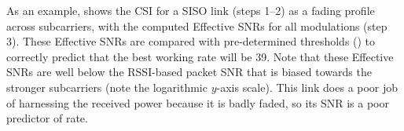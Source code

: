As an example,  shows the CSI for a SISO link (steps 1--2) as a fading profile across subcarriers, with the computed Effective SNRs for all modulations (step 3). These Effective SNRs are compared with pre-determined thresholds () to correctly predict that the best working rate will be 39\Mbps. 
Note that these Effective SNRs are well below the RSSI-based packet SNR that is biased towards the stronger subcarriers (note the logarithmic $y$-axis scale). This link does a poor job of harnessing the received power because it is badly faded, so its SNR is a poor predictor of rate.

\ifx\mainfile\undefined

\fi
